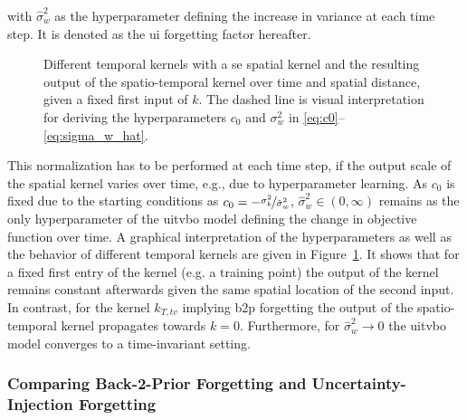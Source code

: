 with $\hat{\sigma}_w^2$ as the hyperparameter defining the increase in variance at each time step. It is denoted as the \gls{ui} forgetting factor hereafter.
\begin{figure}[t]
    \centering
    
    \caption[Visualization of the output of a composite kernel with different temporal kernels.]{Different temporal kernels with a \gls{se} spatial kernel and the resulting output of the spatio-temporal kernel over time and spatial distance, given a fixed first input of $k$. The dashed line is visual interpretation for deriving the hyperparameters $c_0$ and $\sigma_w^2$ in \eqref{eq:c0}--\eqref{eq:sigma_w_hat}.}
    \label{fig:forgetting_factor}
\end{figure}
This normalization has to be performed at each time step, if the output scale of the spatial kernel varies over time, e.g., due to hyperparameter learning. As $c_0$ is fixed due to the starting conditions as $c_0 = -\nicefrac{\sigma_k^2}{\hat{\sigma}_w^2}$, $\hat{\sigma}_w^2 \in (0, \infty)$ remains as the only hyperparameter of the \gls{uitvbo} model defining the change in objective function over time. A graphical interpretation of the hyperparameters as well as the behavior of different temporal kernels are given in Figure~\ref{fig:forgetting_factor}. It shows that for a fixed first entry of the kernel (e.g. a training point) the output of the kernel remains constant afterwards given the same spatial location of the second input. In contrast, for the kernel $k_{T,tv}$ implying \gls{b2p} forgetting the output of the spatio-temporal kernel propagates towards $k=0$. Furthermore, for $\hat{\sigma}_w^2 \to 0$ the \gls{uitvbo} model converges to a time-invariant setting. 

\subsubsection{Comparing Back-2-Prior Forgetting and Uncertainty-Injection Forgetting}
\label{sec:comp_b2p_ui}

